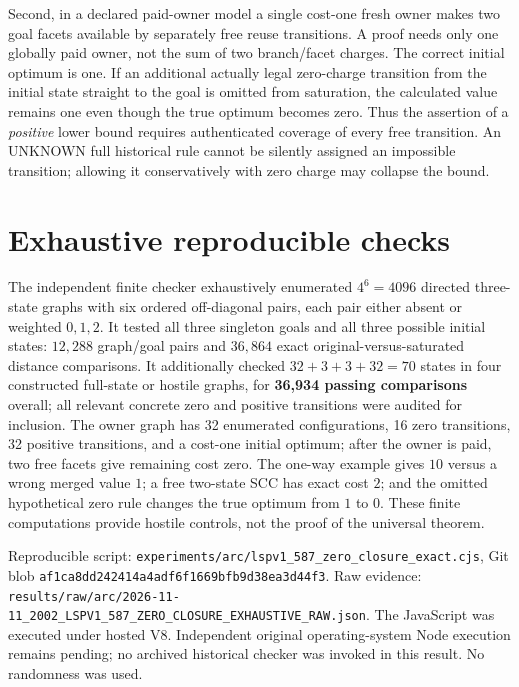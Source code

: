 \documentclass[11pt]{article}
\begin{document}
Second, in a declared paid-owner model a single cost-one fresh owner makes two goal facets available by separately free reuse transitions. A proof needs only one globally paid owner, not the sum of two branch/facet charges. The correct initial optimum is one. If an additional actually legal zero-charge transition from the initial state straight to the goal is omitted from saturation, the calculated value remains one even though the true optimum becomes zero. Thus the assertion of a \emph{positive} lower bound requires authenticated coverage of every free transition. An UNKNOWN full historical rule cannot be silently assigned an impossible transition; allowing it conservatively with zero charge may collapse the bound.

\section*{Exhaustive reproducible checks}
The independent finite checker exhaustively enumerated $4^6=4096$ directed three-state graphs with six ordered off-diagonal pairs, each pair either absent or weighted $0,1,2$. It tested all three singleton goals and all three possible initial states: $12,288$ graph/goal pairs and $36,864$ exact original-versus-saturated distance comparisons. It additionally checked $32+3+3+32=70$ states in four constructed full-state or hostile graphs, for \textbf{36,934 passing comparisons} overall; all relevant concrete zero and positive transitions were audited for inclusion. The owner graph has 32 enumerated configurations, 16 zero transitions, 32 positive transitions, and a cost-one initial optimum; after the owner is paid, two free facets give remaining cost zero. The one-way example gives $10$ versus a wrong merged value $1$; a free two-state SCC has exact cost $2$; and the omitted hypothetical zero rule changes the true optimum from $1$ to $0$. These finite computations provide hostile controls, not the proof of the universal theorem.

Reproducible script: \texttt{experiments/arc/lspv1\_587\_zero\_closure\_exact.cjs}, Git blob \texttt{af1ca8dd242414a4adf6f1669bfb9d38ea3d44f3}. Raw evidence: \texttt{results/raw/arc/2026-11-11\_2002\_LSPV1\_587\_ZERO\_CLOSURE\_EXHAUSTIVE\_RAW.json}. The JavaScript was executed under hosted V8. Independent original operating-system Node execution remains pending; no archived historical checker was invoked in this result. No randomness was used.
\end{document}
